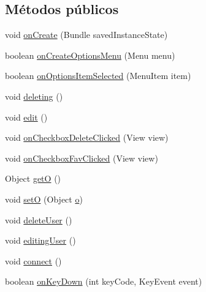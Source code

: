 \subsection*{Métodos públicos}
\begin{DoxyCompactItemize}
\item 
void \hyperlink{classes_1_1ucm_1_1tfg_1_1controlremotolinux_1_1client_1_1controller_1_1ClientActivityTabs_a3af3a4b6ce37fe1134a1b890dec498ae}{on\-Create} (Bundle saved\-Instance\-State)
\item 
boolean \hyperlink{classes_1_1ucm_1_1tfg_1_1controlremotolinux_1_1client_1_1controller_1_1ClientActivityTabs_a1a952d64c86640f6ae928ec4a519114a}{on\-Create\-Options\-Menu} (Menu menu)
\item 
boolean \hyperlink{classes_1_1ucm_1_1tfg_1_1controlremotolinux_1_1client_1_1controller_1_1ClientActivityTabs_a1ac61a2d32fe423745efacb836b9fab2}{on\-Options\-Item\-Selected} (Menu\-Item item)
\item 
void \hyperlink{classes_1_1ucm_1_1tfg_1_1controlremotolinux_1_1client_1_1controller_1_1ClientActivityTabs_ad0783ed34c9e4c08d8ee5dfd9b139697}{deleting} ()
\item 
void \hyperlink{classes_1_1ucm_1_1tfg_1_1controlremotolinux_1_1client_1_1controller_1_1ClientActivityTabs_af650ac1f1ad7613f4baa1b1bbf6c8f9c}{edit} ()
\item 
void \hyperlink{classes_1_1ucm_1_1tfg_1_1controlremotolinux_1_1client_1_1controller_1_1ClientActivityTabs_ae8b03908b86200a724af1298a52d8c7f}{on\-Checkbox\-Delete\-Clicked} (View view)
\item 
void \hyperlink{classes_1_1ucm_1_1tfg_1_1controlremotolinux_1_1client_1_1controller_1_1ClientActivityTabs_a33e7a1ba1c4dffbcd49137614cb7bcc2}{on\-Checkbox\-Fav\-Clicked} (View view)
\item 
Object \hyperlink{classes_1_1ucm_1_1tfg_1_1controlremotolinux_1_1client_1_1controller_1_1ClientActivityTabs_a4a3c7682b57e70e206d5ede428e109f3}{get\-O} ()
\item 
void \hyperlink{classes_1_1ucm_1_1tfg_1_1controlremotolinux_1_1client_1_1controller_1_1ClientActivityTabs_a16f371a4cd5fe40e71e71f33a840184a}{set\-O} (Object \hyperlink{classes_1_1ucm_1_1tfg_1_1controlremotolinux_1_1client_1_1controller_1_1ClientActivityTabs_a5d1c55ad6ecc5b6118cfc45e089ade9e}{o})
\item 
void \hyperlink{classes_1_1ucm_1_1tfg_1_1controlremotolinux_1_1client_1_1controller_1_1ClientActivityTabs_a0daf4a15764eca74f5f8a5a786ce4c43}{delete\-User} ()
\item 
void \hyperlink{classes_1_1ucm_1_1tfg_1_1controlremotolinux_1_1client_1_1controller_1_1ClientActivityTabs_a133a80c029a70d1630e7005de8a6b28e}{editing\-User} ()
\item 
void \hyperlink{classes_1_1ucm_1_1tfg_1_1controlremotolinux_1_1client_1_1controller_1_1ClientActivityTabs_a4c9231701c8ade976dbd777f5db5c202}{connect} ()
\item 
boolean \hyperlink{classes_1_1ucm_1_1tfg_1_1controlremotolinux_1_1client_1_1controller_1_1ClientActivityTabs_a830f891ecf9f4639eb356cf9439f7a2f}{on\-Key\-Down} (int key\-Code, Key\-Event event)
\end{DoxyCompactItemize}
